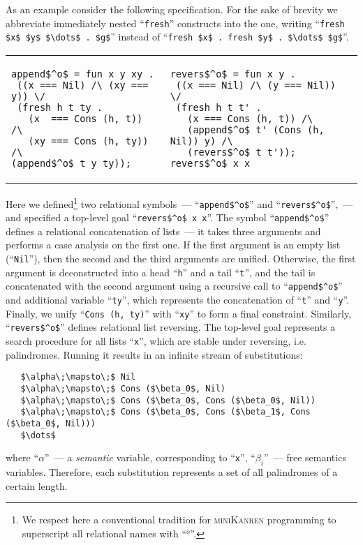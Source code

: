 As an example consider the following specification. For the sake of brevity we
abbreviate immediately nested ``\lstinline|fresh|'' constructs into the one, writing ``\lstinline|fresh $x$ $y$ $\dots$ . $g$|'' instead of
``\lstinline|fresh $x$ . fresh $y$ . $\dots$ $g$|''.

\begin{tabular}{p{5.5cm}p{5.5cm}}
\begin{lstlisting}
append$^o$ = fun x y xy .
 ((x === Nil) /\ (xy === y)) \/
 (fresh h t ty .
   (x  === Cons (h, t))  /\
   (xy === Cons (h, ty)) /\
(append$^o$ t y ty));
\end{lstlisting} &
\begin{lstlisting}
revers$^o$ = fun x y .
 ((x === Nil) /\ (y === Nil)) \/
 (fresh h t t' .
   (x === Cons (h, t)) /\
   (append$^o$ t' (Cons (h, Nil)) y) /\
   (revers$^o$ t t'));
revers$^o$ x x
\end{lstlisting}
\end{tabular}

Here we defined\footnote{We respect here a conventional tradition for \textsc{miniKanren} programming to superscript all relational names with ``$^o$''.}
two relational symbols~--- ``\lstinline|append$^o$|'' and ``\lstinline|revers$^o$|'',~--- and specified a top-level goal ``\lstinline|revers$^o$ x x|''.
The symbol ``\lstinline|append$^o$|'' defines a relational concatenation of lists~--- it takes three arguments and performs a case analysis on the first one. If the
first argument is an empty list (``\lstinline|Nil|''), then the second and the third arguments are unified. Otherwise, the first argument is deconstructed into a head ``\lstinline|h|''
and a tail ``\lstinline|t|'', and the tail is concatenated with the second argument using a recursive call to ``\lstinline|append$^o$|'' and additional variable ``\lstinline|ty|'', which
represents the concatenation of ``\lstinline|t|'' and ``\lstinline|y|''. Finally, we unify ``\lstinline|Cons (h, ty)|'' with ``\lstinline|xy|'' to form a final constraint. Similarly,
``\lstinline|revers$^o$|'' defines relational list reversing. The top-level goal represents a search procedure for all lists ``\lstinline|x|'', which are stable under reversing, i.e.
palindromes. Running it results in an infinite stream of substitutions:

\begin{lstlisting}
   $\alpha\;\mapsto\;$ Nil
   $\alpha\;\mapsto\;$ Cons ($\beta_0$, Nil)
   $\alpha\;\mapsto\;$ Cons ($\beta_0$, Cons ($\beta_0$, Nil))
   $\alpha\;\mapsto\;$ Cons ($\beta_0$, Cons ($\beta_1$, Cons ($\beta_0$, Nil)))
   $\dots$
\end{lstlisting}

where ``$\alpha$''~--- a \emph{semantic} variable, corresponding to ``\lstinline|x|'', ``$\beta_i$''~--- free semantics variables. Therefore, each substitution represents a set of all palindromes of a certain length.

